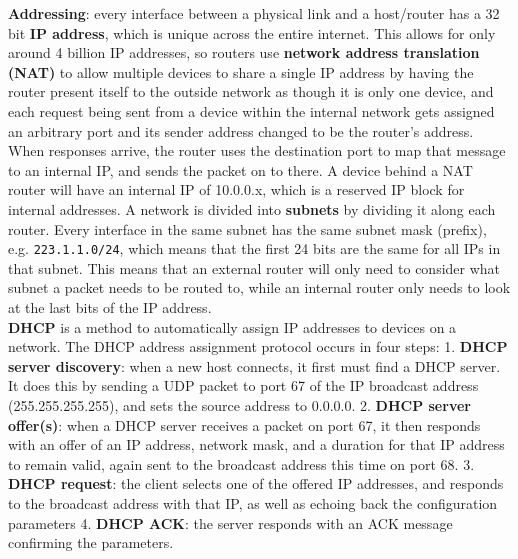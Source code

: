 \textbf{Addressing}: every interface between a physical link and a host/router has a 32 bit \textbf{IP address}, which is unique across the entire internet. This allows for only around 4 billion IP addresses, so routers use \textbf{network address translation (NAT)} to allow multiple devices to share a single IP address by having the router present itself to the outside network as though it is only one device, and each request being sent from a device within the internal network gets assigned an arbitrary port and its sender address changed to be the router's address. When responses arrive, the router uses the destination port to map that message to an internal IP, and sends the packet on to there. A device behind a NAT router will have an internal IP of 10.0.0.x, which is a reserved IP block for internal addresses. A network is divided into \textbf{subnets} by dividing it along each router. Every interface in the same subnet has the same subnet mask (prefix), e.g. \verb|223.1.1.0/24|, which means that the first 24 bits are the same for all IPs in that subnet. This means that an external router will only need to consider what subnet a packet needs to be routed to, while an internal router only needs to look at the last bits of the IP address.\\
\textbf{DHCP} is a method to automatically assign IP addresses to devices on a network. The DHCP address assignment protocol occurs in four steps: 1. \textbf{DHCP server discovery}: when a new host connects, it first must find a DHCP server. It does this by sending a UDP packet to port 67 of the IP broadcast address (255.255.255.255), and sets the source address to 0.0.0.0. 2. \textbf{DHCP server offer(s)}: when a DHCP server receives a packet on port 67, it then responds with an offer of an IP address, network mask, and a duration for that IP address to remain valid, again sent to the broadcast address this time on port 68. 3. \textbf{DHCP request}: the client selects one of the offered IP addresses, and responds to the broadcast address with that IP, as well as echoing back the configuration parameters 4. \textbf{DHCP ACK}: the server responds with an ACK message confirming the parameters.\\

